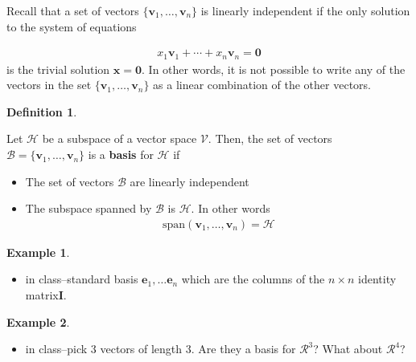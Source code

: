 \documentclass[
]{book}
\providecommand{\tightlist}{%
  \setlength{\itemsep}{0pt}\setlength{\parskip}{0pt}}
\theoremstyle{definition}
\newtheorem{definition}{Definition}[chapter]
\theoremstyle{definition}
\newtheorem{example}{Example}[chapter]
\theoremstyle{definition}
\theoremstyle{remark}
\begin{document}
Recall that a set of vectors \(\{ \mathbf{v}_1, \ldots, \mathbf{v}_n\}\) is linearly independent if the only solution to the system of equations

\[
\begin{aligned}
x_1 \mathbf{v}_1 + \cdots + x_n \mathbf{v}_n = \mathbf{0}
\end{aligned}
\]
is the trivial solution \(\mathbf{x} = \mathbf{0}\). In other words, it is not possible to write any of the vectors in the set \(\{ \mathbf{v}_1, \ldots, \mathbf{v}_n\}\) as a linear combination of the other vectors.

\begin{definition}
\protect\hypertarget{def:unlabeled-div-126}{}\label{def:unlabeled-div-126}

Let \(\mathcal{H}\) be a subspace of a vector space \(\mathcal{V}\). Then, the set of vectors \(\mathcal{B} = \{ \mathbf{v}_1, \ldots, \mathbf{v}_n \}\) is a \textbf{basis} for \(\mathcal{H}\) if

\begin{itemize}
\item
  The set of vectors \(\mathcal{B}\) are linearly independent
\item
  The subspace spanned by \(\mathcal{B}\) is \(\mathcal{H}\). In other words
  \[
  \begin{aligned}
  \mbox{span}(\mathbf{v}_1, \ldots, \mathbf{v}_n) = \mathcal{H}
  \end{aligned}
  \]
\end{itemize}

\end{definition}

\begin{example}
\protect\hypertarget{exm:unlabeled-div-127}{}\label{exm:unlabeled-div-127}

\begin{itemize}
\tightlist
\item
  in class--standard basis \(\mathbf{e}_1, \ldots \mathbf{e}_n\) which are the columns of the \(n \times n\) identity matrix\(\mathbf{I}\).
\end{itemize}

\end{example}

\begin{example}
\protect\hypertarget{exm:unlabeled-div-128}{}\label{exm:unlabeled-div-128}

\begin{itemize}
\tightlist
\item
  in class--pick 3 vectors of length 3. Are they a basis for \(\mathcal{R}^3\)? What about \(\mathcal{R}^4\)?
\end{itemize}

\end{example}
\end{document}
